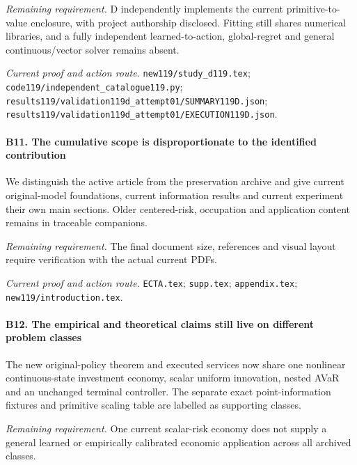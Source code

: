 \par\emph{Remaining requirement.} D independently implements the current primitive-to-value enclosure, with project authorship disclosed. Fitting still shares numerical libraries, and a fully independent learned-to-action, global-regret and general continuous/\allowbreak{}vector solver remains absent.

\par\emph{Current proof and action route.} \nolinkurl{new119/study_d119.tex}; \nolinkurl{code119/independent_catalogue119.py}; \nolinkurl{results119/validation119d_attempt01/SUMMARY119D.json}; \nolinkurl{results119/validation119d_attempt01/EXECUTION119D.json}.

\paragraph{B11. The cumulative scope is disproportionate to the identified contribution}

We distinguish the active article from the preservation archive and give current original-model foundations, current information results and current experiment their own main sections. Older centered-risk, occupation and application content remains in traceable companions.

\par\emph{Remaining requirement.} The final document size, references and visual layout require verification with the actual current PDFs.

\par\emph{Current proof and action route.} \nolinkurl{ECTA.tex}; \nolinkurl{supp.tex}; \nolinkurl{appendix.tex}; \nolinkurl{new119/introduction.tex}.

\paragraph{B12. The empirical and theoretical claims still live on different problem classes}

The new original-policy theorem and executed services now share one nonlinear continuous-state investment economy, scalar uniform innovation, nested AVaR and an unchanged terminal controller. The separate exact point-information fixtures and primitive scaling table are labelled as supporting classes.

\par\emph{Remaining requirement.} One current scalar-risk economy does not supply a general learned or empirically calibrated economic application across all archived classes.

